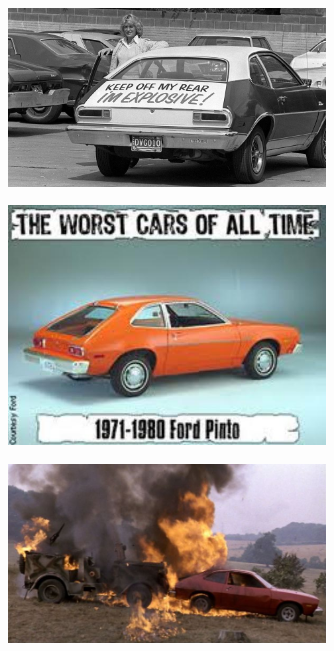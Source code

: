 \documentclass[aspectratio=1610,pdftex,dvipsnames,compress,xcolor={dvipsnames}]{beamer}
\begin{document}
\begin{frame}{}
    \begin{figure}
        \centering
        \includegraphics[width=0.75\textwidth]{pinto.rear.jpg}
    \end{figure}
\end{frame}


\begin{frame}{}
    \begin{figure}
        \centering
        \includegraphics[width=0.75\textwidth]{pinto.worst.jpg}
    \end{figure}
\end{frame}


\begin{frame}{}
    \begin{figure}
        \centering
        \includegraphics[width=0.75\textwidth]{pinto.fire.jpg}
    \end{figure}
\end{frame}
\end{document}
